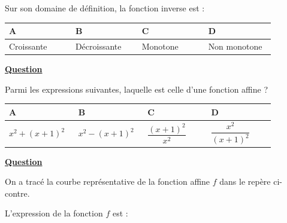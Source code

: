 \documentclass[oneside,12pt]{article}
\begin{document}
Sur son domaine de définition, la fonction inverse est :

\begin{center}
	\renewcommand{\arraystretch}{1.35}
	\begin{tabular}{| P{0.22\linewidth} | P{0.22\linewidth} | P{0.22\linewidth} | P{0.22\linewidth} |} \hline
	A & B & C & D \\ \hline
	Croissante & Décroissante & Monotone & Non monotone \\ \hline
	\end{tabular}
\end{center}



\underline{\textbf{Question }}

Parmi les expressions suivantes, laquelle est celle d'une fonction affine ?

\begin{center}
	\renewcommand{\arraystretch}{1.35}
	\begin{tabular}{| P{0.22\linewidth} | P{0.22\linewidth} | P{0.22\linewidth} | P{0.22\linewidth} |} \hline
	A & B & C & D \\ \hline
	\rule{0pt}{8mm}
	$x^2+(x+1)^2$ & $x^2-(x+1)^2$ & $\dfrac{(x+1)^2}{x^2}$ & $\dfrac{x^2}{(x+1)^2}$ \\[3.5mm] \hline
	\end{tabular}
\end{center}



\newpage
\underline{\textbf{Question }}

\begin{minipage}{0.6\linewidth} \restoreskip
	On a tracé la courbe représentative de la fonction affine $f$ dans le repère ci-contre.
	
	L'expression de la fonction $f$ est :
\end{minipage} \hspace{5mm}
\begin{minipage}{0.4\linewidth} \vspace{-5mm}
\end{minipage}
\end{document}

